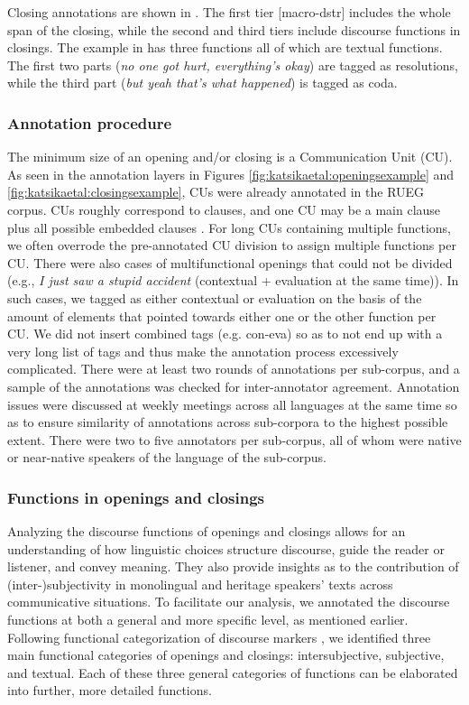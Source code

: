 \documentclass[output=paper,colorlinks,citecolor=brown]{langscibook}
\begin{document}
Closing annotations are shown in . The first tier [macro-dstr] includes the whole span of the closing, while the second and third tiers include discourse functions in closings. The example in  has three functions all of which are textual functions. The first two parts (\textit{no one got hurt, everything’s okay}) are tagged as resolutions, while the third part (\textit{but yeah that’s what happened}) is tagged as coda. 

\subsubsection{Annotation procedure}
The minimum size of an opening and/or closing is a Communication Unit (CU). As seen in the annotation layers in Figures \ref{fig:katsikaetal:openingsexample} and \ref{fig:katsikaetal:closingsexample}, CUs were already annotated in the RUEG corpus. CUs roughly correspond to clauses, and one CU may be a main clause plus all possible embedded clauses \parencite{topaj_grammatical_2020}. For long CUs containing multiple functions, we often overrode the pre-annotated CU division to assign multiple functions per CU. There were also cases of multifunctional openings that could not be divided (e.g., \textit{I just saw a stupid accident} (contextual + evaluation at the same time)). In such cases, we tagged as either contextual or evaluation on the basis of the amount of elements that pointed towards either one or the other function per CU. We did not insert combined tags (e.g. con-eva) so as to not end up with a very long list of tags and thus make the annotation process excessively complicated. There were at least two rounds of annotations per sub-corpus, and a sample of the annotations was checked for inter-annotator agreement. Annotation issues were discussed at weekly meetings across all languages at the same time so as to ensure similarity of annotations across sub-corpora to the highest possible extent. There were two to five annotators per sub-corpus, all of whom were native or near-native speakers of the language of the sub-corpus.

\subsubsection{Functions in openings and closings} \label{sec:katsikaetal:functionsopenclos}
Analyzing the discourse functions of openings and closings allows for an understanding of how linguistic choices structure discourse, guide the reader or listener, and convey meaning. They also provide insights as to the contribution of (inter-)subjectivity in monolingual and heritage speakers’ texts across communicative situations. To facilitate our analysis, we annotated the discourse functions at both a general and more specific level, as mentioned earlier. Following functional categorization of discourse markers \parencite[e.g.,][]{brinton_pragmatic_1996}, we identified three main functional categories of openings and closings: intersubjective, subjective, and textual. Each of these three general categories of functions can be elaborated into further, more detailed functions. 
\end{document}
